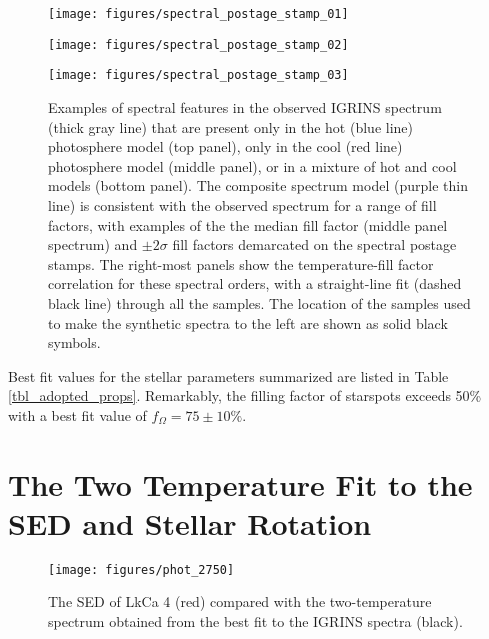 \documentclass[twocolumn]{emulateapj}%
\begin{document}
\begin{figure*}
 \centering
 \texttt{[image: figures/spectral\_postage\_stamp\_01]} 

 \texttt{[image: figures/spectral\_postage\_stamp\_02]} 

 \texttt{[image: figures/spectral\_postage\_stamp\_03]} 
 \caption{Examples of spectral features in the observed IGRINS spectrum (thick gray line) that are present only in the hot (blue line) photosphere model (top panel), only in the cool (red line) photosphere model (middle panel), or in a mixture of hot and cool models (bottom panel).  The composite spectrum model (purple thin line) is consistent with the observed spectrum for a range of fill factors, with examples of the the median fill factor (middle panel spectrum) and $\pm2\sigma$ fill factors demarcated on the spectral postage stamps.  The right-most panels show the temperature-fill factor correlation for these spectral orders, with a straight-line fit (dashed black line) through all the samples.  The location of the samples used to make the synthetic spectra to the left are shown as solid black symbols.}
 \label{fig:specPostageStamp}
\end{figure*}

Best fit values for the stellar parameters summarized are listed in Table \ref{tbl_adopted_props}.  Remarkably, the filling factor of starspots exceeds 50\% with a best fit value of $f_{\Omega}=75\pm 10 \% $.





\section{The Two Temperature Fit to the SED and Stellar Rotation}\label{sec:GJHsection4}

\begin{figure}
 \centering
 \texttt{[image: figures/phot\_2750]}
\caption{The SED of LkCa 4 (red) compared with the two-temperature spectrum obtained from the best fit to the IGRINS spectra (black).}
\label{fig:sed}
\end{figure}
\end{document}
